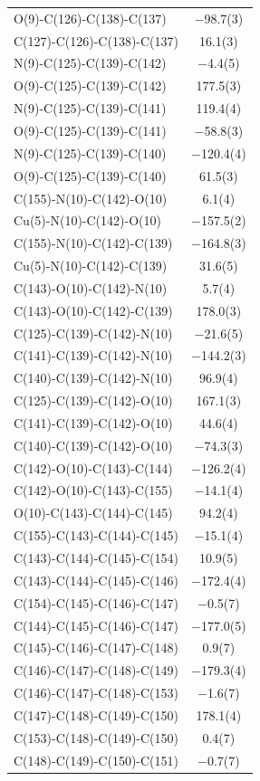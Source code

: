 \begin{center}
{\begin{supertabular}{p{1.8in}c}
O(9)-C(126)-C(138)-C(137)&$-$98.7(3)\\
C(127)-C(126)-C(138)-C(137)&16.1(3)\\
N(9)-C(125)-C(139)-C(142)&$-$4.4(5)\\
O(9)-C(125)-C(139)-C(142)&177.5(3)\\
N(9)-C(125)-C(139)-C(141)&119.4(4)\\
O(9)-C(125)-C(139)-C(141)&$-$58.8(3)\\
N(9)-C(125)-C(139)-C(140)&$-$120.4(4)\\
O(9)-C(125)-C(139)-C(140)&61.5(3)\\
C(155)-N(10)-C(142)-O(10)&6.1(4)\\
Cu(5)-N(10)-C(142)-O(10)&$-$157.5(2)\\
C(155)-N(10)-C(142)-C(139)&$-$164.8(3)\\
Cu(5)-N(10)-C(142)-C(139)&31.6(5)\\
C(143)-O(10)-C(142)-N(10)&5.7(4)\\
C(143)-O(10)-C(142)-C(139)&178.0(3)\\
C(125)-C(139)-C(142)-N(10)&$-$21.6(5)\\
C(141)-C(139)-C(142)-N(10)&$-$144.2(3)\\
C(140)-C(139)-C(142)-N(10)&96.9(4)\\
C(125)-C(139)-C(142)-O(10)&167.1(3)\\
C(141)-C(139)-C(142)-O(10)&44.6(4)\\
C(140)-C(139)-C(142)-O(10)&$-$74.3(3)\\
C(142)-O(10)-C(143)-C(144)&$-$126.2(4)\\
C(142)-O(10)-C(143)-C(155)&$-$14.1(4)\\
O(10)-C(143)-C(144)-C(145)&94.2(4)\\
C(155)-C(143)-C(144)-C(145)&$-$15.1(4)\\
C(143)-C(144)-C(145)-C(154)&10.9(5)\\
C(143)-C(144)-C(145)-C(146)&$-$172.4(4)\\
C(154)-C(145)-C(146)-C(147)&$-$0.5(7)\\
C(144)-C(145)-C(146)-C(147)&$-$177.0(5)\\
C(145)-C(146)-C(147)-C(148)&0.9(7)\\
C(146)-C(147)-C(148)-C(149)&$-$179.3(4)\\
C(146)-C(147)-C(148)-C(153)&$-$1.6(7)\\
C(147)-C(148)-C(149)-C(150)&178.1(4)\\
C(153)-C(148)-C(149)-C(150)&0.4(7)\\
C(148)-C(149)-C(150)-C(151)&$-$0.7(7)\\

\end{supertabular}}
\end{center}
